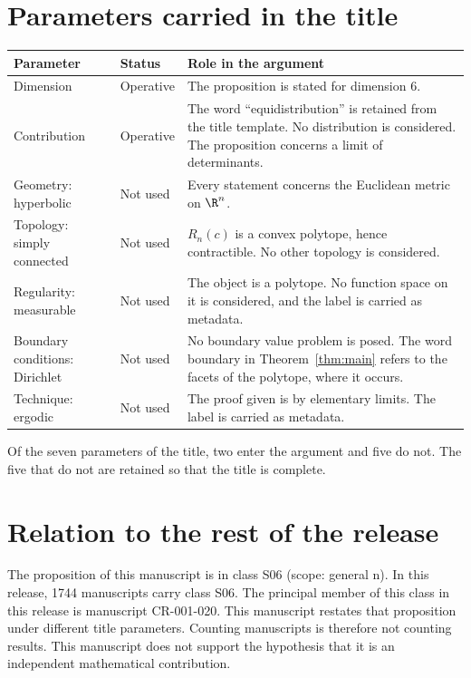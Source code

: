 \documentclass[11pt]{article}
\begin{document}
\section{Parameters carried in the title}\label{sec:params}
\begin{center}
\small
\begin{tabular}{p{}p{}p{}}
\toprule
Parameter & Status & Role in the argument \\
\midrule
Dimension & Operative & The proposition is stated for dimension $6$. \\
Contribution & Operative & The word ``equidistribution'' is retained from the title template. No distribution is considered. The proposition concerns a limit of determinants. \\
Geometry: hyperbolic & Not used & Every statement concerns the Euclidean metric on $\R^n$. \\
Topology: simply connected & Not used & $R_n(c)$ is a convex polytope, hence contractible. No other topology is considered. \\
Regularity: measurable & Not used & The object is a polytope. No function space on it is considered, and the label is carried as metadata. \\
Boundary conditions: Dirichlet & Not used & No boundary value problem is posed. The word boundary in Theorem~\ref{thm:main} refers to the facets of the polytope, where it occurs. \\
Technique: ergodic & Not used & The proof given is by elementary limits. The label is carried as metadata. \\
\bottomrule
\end{tabular}
\end{center}
Of the seven parameters of the title, two enter the argument and five do not. The five that do not are retained so that the title is complete.

\section{Relation to the rest of the release}
The proposition of this manuscript is in class S06 (scope: general n).
In this release, 1744 manuscripts carry class S06. The principal member of this class in this release is manuscript CR-001-020. This manuscript restates that proposition under different title parameters.
Counting manuscripts is therefore not counting results. This manuscript does not support the hypothesis that it is an independent mathematical contribution.
\end{document}
